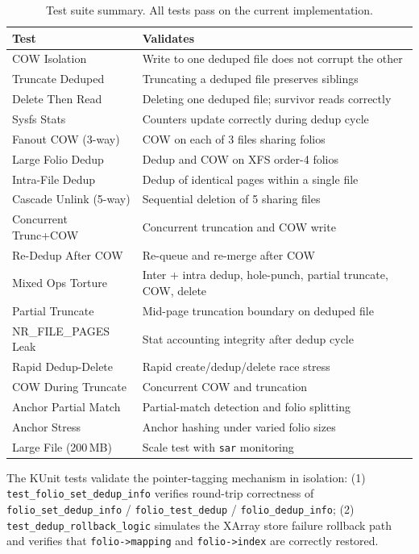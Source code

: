 \documentclass[conference]{IEEEtran}
\begin{document}
\begin{table}[t]
\caption{Test suite summary. All tests pass on the current implementation.}
\label{tab:tests}
\centering
\scriptsize
\begin{tabular}{@{}p{2.8cm}p{4.5cm}@{}}
\toprule
\textbf{Test} & \textbf{Validates} \\
\midrule
COW Isolation & Write to one deduped file does not corrupt the other \\
Truncate Deduped & Truncating a deduped file preserves siblings \\
Delete Then Read & Deleting one deduped file; survivor reads correctly \\
Sysfs Stats & Counters update correctly during dedup cycle \\
Fanout COW (3-way) & COW on each of 3 files sharing folios \\
Large Folio Dedup & Dedup and COW on XFS order-4 folios \\
Intra-File Dedup & Dedup of identical pages within a single file \\
Cascade Unlink (5-way) & Sequential deletion of 5 sharing files \\
Concurrent Trunc+COW & Concurrent truncation and COW write \\
Re-Dedup After COW & Re-queue and re-merge after COW \\
Mixed Ops Torture & Inter + intra dedup, hole-punch, partial truncate, COW, delete \\
Partial Truncate & Mid-page truncation boundary on deduped file \\
NR\_FILE\_PAGES Leak & Stat accounting integrity after dedup cycle \\
Rapid Dedup-Delete & Rapid create/dedup/delete race stress \\
COW During Truncate & Concurrent COW and truncation \\
Anchor Partial Match & Partial-match detection and folio splitting \\
Anchor Stress & Anchor hashing under varied folio sizes \\
Large File (200\,MB) & Scale test with \texttt{sar} monitoring \\
\bottomrule
\end{tabular}
\end{table}

The KUnit tests validate the pointer-tagging mechanism in isolation: (1) \texttt{test\_folio\_set\_dedup\_info} verifies round-trip correctness of \texttt{folio\_set\_dedup\_info} / \texttt{folio\_test\_dedup} / \texttt{folio\_dedup\_info}; (2) \texttt{test\_dedup\_rollback\_logic} simulates the XArray store failure rollback path and verifies that \texttt{folio->mapping} and \texttt{folio->index} are correctly restored.
\end{document}
